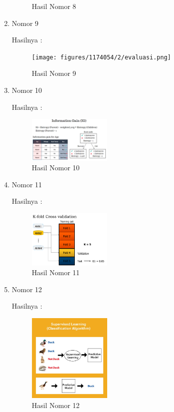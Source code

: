 \begin{enumerate}
\begin{figure}[H]
		\centering
		\caption{Hasil Nomor 8}
	\end{figure}
\item Nomor 9
		\hfill\break
		
	Hasilnya :
	\begin{figure}[H]
		\texttt{[image: figures/1174054/2/evaluasi.png]}
		\centering
		\caption{Hasil Nomor 9}
	\end{figure}
\item Nomor 10
		\hfill\break
		
	Hasilnya :
	\begin{figure}[H]
		\includegraphics[width=4cm]{figures/1174053/2/information.png}
		\centering
		\caption{Hasil Nomor 10}
	\end{figure}
\item Nomor 11
		\hfill\break
		
	Hasilnya :
	\begin{figure}[H]
		\includegraphics[width=4cm]{figures/1174053/2/kfold.png}
		\centering
		\caption{Hasil Nomor 11}
	\end{figure}
\item Nomor 12
		\hfill\break
		
	Hasilnya :
	\begin{figure}[H]
		\includegraphics[width=4cm]{figures/1174053/2/supervised.jpg}
		\centering
		\caption{Hasil Nomor 12}
	\end{figure}
\end{enumerate}
